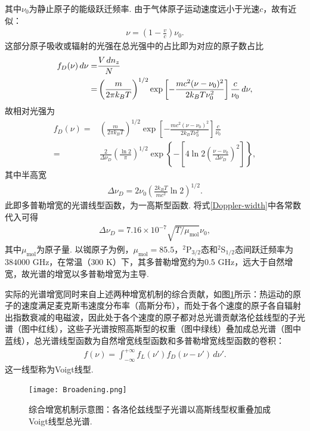 \documentclass[a4paper, 10pt]{article}
\newcounter{subsubsubsection}[subsubsection]
\begin{document}
\begin{multicols}{2}
其中$\nu_0$为静止原子的能级跃迁频率. 由于气体原子运动速度远小于光速$c$，故有近似：
\begin{align}
    \nu=\left(1-\frac{v}{c}\right)\nu_0.
\end{align}
这部分原子吸收或辐射的光强在总光强中的占比即为对应的原子数占比
\begin{align}
    \notag f_D(\nu)\,d\nu=&\frac{V\,dn_z}{N}\\
    =&\left(\frac{m}{2\pi k_BT}\right)^{1/2}\exp\left[-\frac{mc^2(\nu-\nu_0)^2}{2k_BT\nu_0^2}\right]\frac{c}{\nu_0}\,d\nu,
\end{align}
故相对光强为
\begin{align}
    \nonumber f_D(\nu)=&\left(\frac{m}{2\pi k_BT}\right)^{1/2}\exp\left[-\frac{mc^2(\nu-\nu_0)^2}{2k_BT\nu_0^2}\right]\frac{c}{\nu_0}\\
    =&\frac{2}{\Delta\nu_D}\left(\frac{\ln 2}{\pi}\right)^{1/2}\exp\left\{-\left[4\ln 2\left(\frac{\nu-\nu_0}{\Delta\nu_D}\right)^2\right]\right\},
\end{align}
其中半高宽
\begin{align}
    \label{Doppler-width}
    \Delta\nu_D=2\nu_0\left(\frac{2k_BT}{mc^2}\ln 2\right)^{1/2}.
\end{align}
此即多普勒增宽的光谱线型函数，为一高斯型函数. 将式\eqref{Doppler-width}中各常数代入可得
\begin{align}
    \Delta\nu_D=7.16\times 10^{-7}\sqrt{T/\mu_{\text{mol}}}\nu_0,
\end{align}
其中$\mu_{\text{mol}}$为原子量. 以铷原子为例，$\mu_{\text{mol}}=85.5$，$^2$P$_{3/2}$态和$^2$S$_{1/2}$态间跃迁频率为$384000$ GHz，在常温（$300$ K）下，其多普勒增宽约为$0.5$ GHz，远大于自然增宽，故光谱的增宽以多普勒增宽为主导.


实际的光谱增宽同时来自上述两种增宽机制的综合贡献，如图\ref{broadening}所示：热运动的原子的速度满足麦克斯韦速度分布率（高斯分布），而处于各个速度的原子各自辐射出指数衰减的电磁波，因此处于各个速度的原子都对总光谱贡献洛伦兹线型的子光谱（图中红线），这些子光谱按照高斯型的权重（图中绿线）叠加成总光谱（图中蓝线），总光谱线型函数为自然增宽线型函数和多普勒增宽线型函数的卷积：
\begin{align}
    f(\nu)=\int_{-\infty}^{+\infty}f_L(\nu')f_D(\nu-\nu')\,d\nu'.
\end{align}
这一线型称为Voigt线型.

\begin{figure}[H]
    \centering
    \texttt{[image: Broadening.png]}
    \caption{综合增宽机制示意图：各洛伦兹线型子光谱以高斯线型权重叠加成Voigt线型总光谱.}
    \label{broadening}
\end{figure}


\end{multicols}
\end{document}
